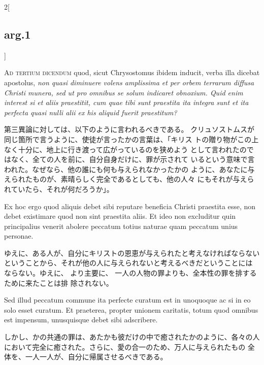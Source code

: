 \documentclass[paper=a4paper,fontsize=10pt,jafontsize=9pt,titlepage]{jlreq}
\begin{document}
\begin{paracol}{2}[\subsection{arg.1}]
\switchcolumn*[\subsection{ad.3}]

{\scshape Ad tertium dicendum} quod, sicut Chrysostomus
ibidem inducit, verba illa dicebat apostolus, {\itshape non quasi diminuere volens
amplissima et per orbem terrarum diffusa Christi munera, sed ut pro
omnibus se solum indicaret obnoxium. 
Quid enim interest si et aliis
praestitit, cum quae tibi sunt praestita ita integra sunt et ita
perfecta quasi nulli alii ex his aliquid fuerit praestitum? }

\switchcolumn

第三異論に対しては、以下のように言われるべきである。
クリュソストムスが同じ箇所で言うように、使徒が言ったかの言葉は、「キリス
 トの贈り物がこの上なく十分に、地上に行き渡って広がっているのを狭めよう
 として言われたのではなく、全ての人を前に、自分自身だけに、罪が示されて
 いるという意味で言われた。なぜなら、他の誰にも何も与えられなかったかの
 ように、あなたに与えられたものが、素晴らしく完全であるとしても、他の人々
 にもそれが与えられていたら、それが何だろうか」。

\switchcolumn*

Ex hoc ergo
quod aliquis debet sibi reputare beneficia Christi praestita esse, non
debet existimare quod non sint praestita aliis. 
Et ideo non excluditur
quin principalius venerit abolere peccatum totius naturae quam peccatum
unius personae.

\switchcolumn

ゆえに、ある人が、自分にキリストの恩恵が与えられたと考えなければならない
 ということから、それが他の人に与えられないと考えるべきだということには
 ならない。ゆえに、
より主要に、 一人の人物の罪よりも、全本性の罪を排するために来たことは排
 除されない。

\switchcolumn*

Sed illud peccatum commune ita perfecte curatum est in
unoquoque ac si in eo solo esset curatum. Et praeterea, propter unionem
caritatis, totum quod omnibus est impensum, unusquisque debet sibi
adscribere.

\switchcolumn

しかし、かの共通の罪は、あたかも彼だけの中で癒されたかのように、各々の人
 において完全に癒された。さらに、愛の合一のため、万人に与えられたもの
 全体を、一人一人が、自分に帰属させるべきである。

\end{paracol}
\newpage
{}
{}
\setcounter{section}{5}
\setcounter{subsection}{0}
\end{document}
